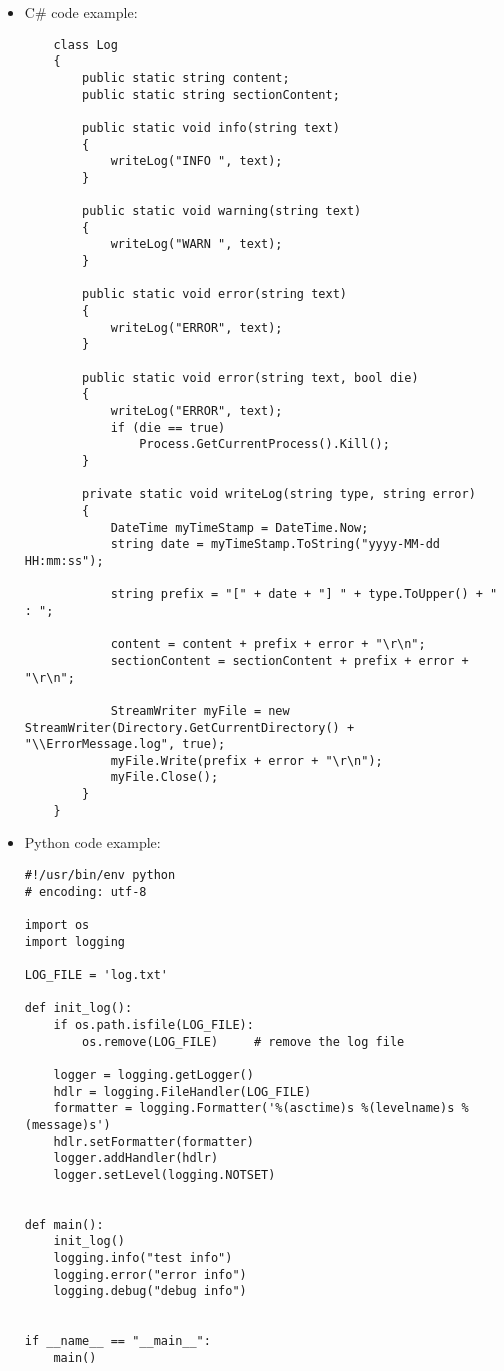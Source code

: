 \begin{itemize}
\item
C\# code example:
\begin{lstlisting}
    class Log
    {
        public static string content;
        public static string sectionContent;

        public static void info(string text)
        {
            writeLog("INFO ", text);
        }

        public static void warning(string text)
        {
            writeLog("WARN ", text);
        }

        public static void error(string text)
        {
            writeLog("ERROR", text);
        }

        public static void error(string text, bool die)
        {
            writeLog("ERROR", text);
            if (die == true)
                Process.GetCurrentProcess().Kill();
        }

        private static void writeLog(string type, string error)
        {
            DateTime myTimeStamp = DateTime.Now;
            string date = myTimeStamp.ToString("yyyy-MM-dd HH:mm:ss");

            string prefix = "[" + date + "] " + type.ToUpper() + " : ";

            content = content + prefix + error + "\r\n";
            sectionContent = sectionContent + prefix + error + "\r\n";

            StreamWriter myFile = new StreamWriter(Directory.GetCurrentDirectory() + "\\ErrorMessage.log", true);
            myFile.Write(prefix + error + "\r\n");
            myFile.Close();
        }
    }
\end{lstlisting}
\item
Python code example:
\begin{lstlisting}
#!/usr/bin/env python
# encoding: utf-8

import os
import logging

LOG_FILE = 'log.txt'

def init_log():
    if os.path.isfile(LOG_FILE):
        os.remove(LOG_FILE)     # remove the log file

    logger = logging.getLogger()
    hdlr = logging.FileHandler(LOG_FILE)
    formatter = logging.Formatter('%(asctime)s %(levelname)s %(message)s')
    hdlr.setFormatter(formatter)
    logger.addHandler(hdlr)
    logger.setLevel(logging.NOTSET)


def main():
    init_log()
    logging.info("test info")
    logging.error("error info")
    logging.debug("debug info")


if __name__ == "__main__":
    main()
\end{lstlisting}
\end{itemize}


